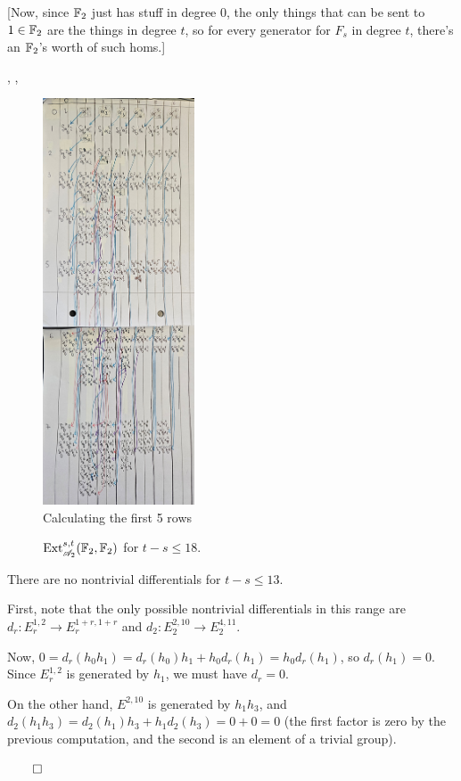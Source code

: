 \documentclass{MetricNotes2023}
\def\bb{\ensuremath\mathbb}
\def\A{\ensuremath{\mathscr{A}_2}}
\DeclareMathOperator{\Ext}{Ext}
\def\done{\begin{flushright}\vspace{-4.35ex}\(\qed\)\end{flushright}}
\begin{document}
[Now, since \(\bb{F}_2\) just has stuff in degree 0, the only things that can be sent to \(1 \in \bb{F}_2\) are the things in degree \(t\), so for every generator for \(F_s\) in degree \(t\), there's an \(\bb{F}_2\)'s worth of such homs.]

\autocite{ass}, \autocite{hatcher5}, \autocite{rognes2}

\begin{figure}[H]\label{2504041920}
\centering
\includegraphics[width=0.4\textwidth]{ext3}
\caption{Calculating the first 5 rows}
\end{figure}

\begin{figure}[H]\label{1304251243}
\centering

\caption[\(\Ext_{\A}^{s,t}(\bb{F}_2, \bb{F}_2)\) for \(t-s\leq 18\).]{\(\Ext_{\A}^{s,t}(\bb{F}_2, \bb{F}_2)\) for \(t-s\leq 18\).\protect\footnotemark}
\end{figure}

\begin{lemma}
There are no nontrivial differentials for \(t-s\leq 13\). 
\end{lemma}

\begin{ourproof}
First, note that the only possible nontrivial differentials in this range are \(d_r : E_r^{1,2} \to E_r^{1+r, 1+r}\) and \(d_2 : E_2^{2, 10} \to E_2^{4, 11}\). 

Now, \(0=d_r(h_0h_1)=d_r(h_0)h_1 + h_0d_r(h_1)=h_0d_r(h_1)\), so \(d_r(h_1)=0\). Since \(E_r^{1, 2}\) is generated by \(h_1\), we must have \(d_r=0\). 

On the other hand, \(E^{2, 10}\) is generated by \(h_1h_3\), and \(d_2(h_1h_3)=d_2(h_1)h_3+h_1d_2(h_3)=0+0=0\) (the first factor is zero by the previous computation, and the second is an element of a trivial group). \done
\end{ourproof}
\end{document}
